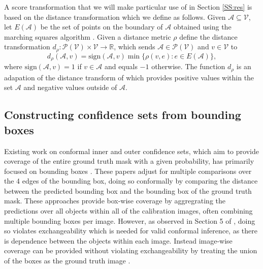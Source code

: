 A score transformation that we will make particular use of in Section \ref{SS:res} is based on the distance transformation which we define as follows. Given $\mathcal{A} \subseteq \mathcal{V}$, let $E(\mathcal{A})$ be the set of points on the boundary of $\mathcal{A}$ obtained using the marching squares algorithm \citep{Maple2003}. Given a distance metric $\rho$ define the distance transformation $d_{\rho}: \mathcal{P}(\mathcal{V}) \times \mathcal{V}\rightarrow \mathbb{R}$, which sends $\mathcal{A} \in \mathcal{P}(\mathcal{V})$ and $v\in \mathcal{V}$ to
\begin{equation*}
	d_{\rho}(\mathcal{A}, v) = \text{sign}(\mathcal{A}, v)\min\lbrace \rho(v, e): e \in E(\mathcal{A})\rbrace, 
\end{equation*}
where $ \text{sign}(\mathcal{A}, v) = 1 $ if $v\in \mathcal{A}$ and equals $-1$ otherwise. The function $d_{\rho}$ is an adapation of the distance transform of \cite{Borgefors1986} which provides positive values within the set $\mathcal{A}$ and negative values outside of $\mathcal{A}$. 
\subsection{Constructing confidence sets from bounding boxes}
Existing work on conformal inner and outer confidence sets, which aim to provide coverage of the entire ground truth mask with a given probability, has primarily focused on bounding boxes \citep{De2022, Andeol2023, Mukama2024}. These papers adjust for multiple comparisons over the 4 edges of the bounding box, doing so conformally by comparing the distance between the predicted bounding box and the bounding box of the ground truth mask. These approaches provide box-wise coverage by aggregrating the predictions over all objects within all of the calibration images, often combining multiple bounding boxes per image. However, as observed in Section 5 of \cite{De2022}, doing so violates exchangeability which is needed for valid conformal inference, as there is dependence between the objects within each image. Instead image-wise coverage can be provided without violating exchangeability by treating the union of the boxes as the ground truth image \citep{De2022, Andeol2023}.


